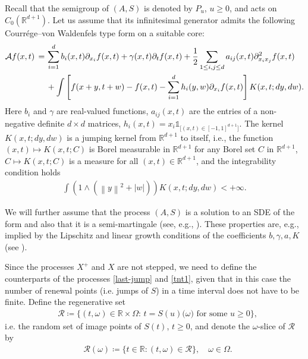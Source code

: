 \documentclass[reqno]{amsart}
\theoremstyle{remark}
\numberwithin{equation}{section} %
\newcommand{\RR}{\mathbb{R}}
\newcommand{\1}{\mathds{1}}
\begin{document}
	Recall that the semigroup of $(A,S)$ is denoted by $P_u$, $u \geq 0$, and acts on $C_0 (\mathbb{R}^{d+1})$. Let us assume that its infinitesimal generator admits the following Courr\'ege--von Waldenfels type form on a suitable core:
	\begin{align}
		\mathcal{A}f(x,t) \, = \, &\sum_{i=1}^d b_i(x,t)\partial_{x_i} f(x,t) + \gamma (x,t) \partial_tf(x,t) + \frac{1}{2} \sum_{1 \leq i, j \leq d} a_{ij}(x,t)\partial_{x_i x_j}^2 f(x,t) \notag \\
		& + \int \left[ f(x+y, t+w)-f(x,t) -\sum_{i=1}^d h_i(y,w) \partial_{x_i} f(x,t)  \right] K(x,t;dy, dw).
		\label{generatorlimit}
	\end{align}
	Here $b_i$ and $\gamma$ are real-valued functions, $a_{ij}(x,t)$ are the entries of a non-negative definite $d\times d$ matrices, $h_i(x,t) = x_i \mathds{1}_{\big[(x,t) \in [-1,1]^{d+1}\big]}$. The kernel $K(x,t;dy, dw)$ is a jumping kernel from $\mathbb{R}^{d+1}$ to itself, i.e., the function $(x,t) \mapsto K(x,t;C)$ is Borel measurable in $\RR^{d+1}$ for any Borel set $C$ in $\RR^{d+1}$, $C \mapsto K(x,t;C)$ is a measure for all $(x,t)\in \RR^{d+1}$, and the integrability condition holds
	\begin{align}
		\int \left( 1 \wedge (\left\| y \right\|^2 + |w|) \right)  K(x,t; dy, dw) < +\infty.
	\end{align}
	
	We will further assume that the process $(A, S)$ is a solution to an SDE of the form \cite[Eq. (6.12), Section 6.2]{applebaum} and also that it is a semi-martingale (see, e.g., \cite{jacod2013limit}). These properties are, e.g., implied by the Lipschitz and linear growth conditions of the coefficients $b, \gamma, a, K$ (see \cite[Chapter 6]{applebaum}).
	
	
	Since the processes $X^+$ and $X$ are not stepped, we need to define the counterparts of the processes \eqref{last-jump} and \eqref{tnt1}, given that in this case the number of renewal points (i.e. jumps of $S$) in a time interval does not have to be finite. 
	Define the regenerative set
	\begin{align}
		& \mathcal{R} \coloneqq \{  (t, \omega) \in \mathbb{R} \times \Omega : \, t = S(u)\big(\omega\big) \text{ for some } u\geq 0 \},
	\end{align}
	i.e. the random set of image points of $S(t)$, $t\ge0$, and denote the $\omega$-slice of $\mathcal{R}$ by
	\begin{align}
		& \mathcal{R}(\omega) \coloneqq \{ t \in \mathbb{R} : (t, \omega) \in \mathcal{R} \},\quad \omega\in\Omega.
	\end{align}
	
\end{document}

